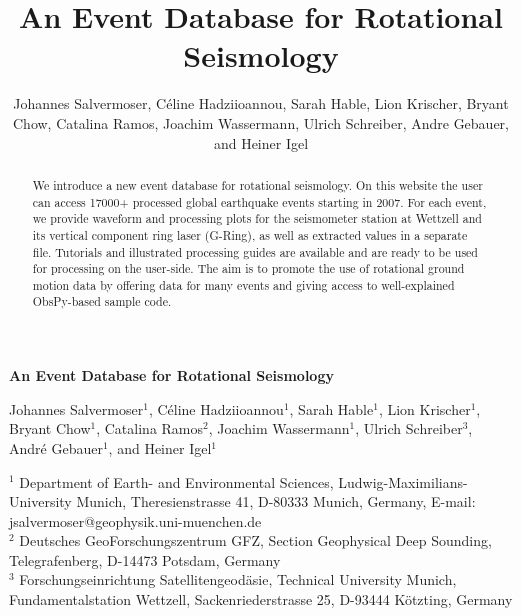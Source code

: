 \documentclass[12pt,reqno,letter]{article}
\begin{document}
% 
\title{An Event Database for Rotational Seismology}

\author{Johannes Salvermoser, C\'{e}line Hadziioannou, Sarah Hable, Lion Krischer, Bryant Chow, Catalina Ramos, Joachim Wassermann, Ulrich Schreiber, Andre Gebauer, and Heiner Igel}

\noindent
\textbf{An Event Database for Rotational Seismology}

\vspace{2em}
\noindent
Johannes Salvermoser$^{1}$, C\'{e}line Hadziioannou$^{1}$, Sarah Hable$^{1}$, Lion Krischer$^{1}$, Bryant Chow$^{1}$, Catalina Ramos$^{2}$, Joachim Wassermann$^{1}$, Ulrich Schreiber$^{3}$, Andr\'{e} Gebauer$^{1}$, and Heiner Igel$^{1}$
\vspace{1em}

\noindent
$^{1}$ Department of Earth- and Environmental Sciences, Ludwig-Maximilians-University Munich, Theresienstrasse 41, D-80333 Munich, Germany, E-mail: jsalvermoser@geophysik.uni-muenchen.de\\
$^{2}$ Deutsches GeoForschungszentrum GFZ, Section Geophysical Deep Sounding, Telegrafenberg, D-14473 Potsdam, Germany\\
$^{3}$ Forschungseinrichtung Satellitengeod{\"a}sie, Technical University Munich, Fundamentalstation Wettzell, Sackenriederstrasse 25, D-93444 K{\"o}tzting, Germany

\begin{abstract}
We introduce a new event database for rotational seismology. On this website the user can access 17000+ processed global earthquake events starting in 2007. For each event, we provide waveform and processing plots for the seismometer station at Wettzell and its vertical component ring laser (G-Ring), as well as extracted values in a separate file. Tutorials and illustrated processing guides are available and are ready to be used for processing on the user-side. The aim is to promote the use of rotational ground motion data by offering data for many events and giving access to well-explained ObsPy-based sample code. 
\end{abstract}
% 
% 
\end{document}
